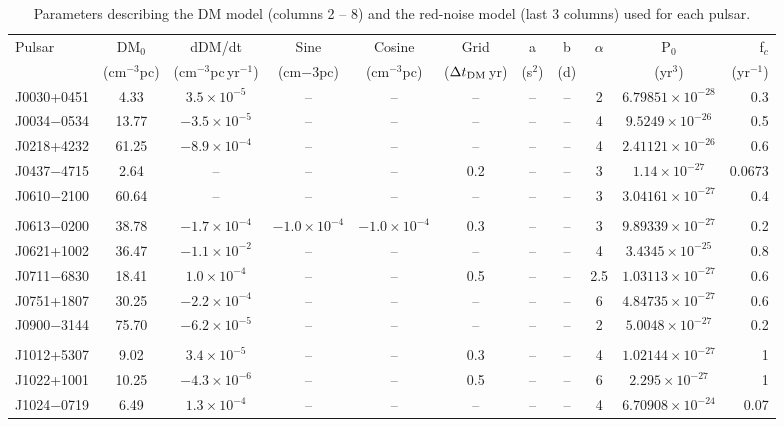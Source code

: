 \begin{table}
\caption{Parameters describing the DM model (columns 2 -- 8) and the red-noise model (last 3 columns) used for each pulsar.}\label{tb:dmModel}
\begin{tabular}{lcccccccccr}
\hline
Pulsar & DM$_0$ & dDM/dt & Sine  & Cosine & Grid & a & b & $\alpha$ & P$_0$ & f$_c$ \\
 & (cm$^{-3}$pc) & (cm$^{-3}$pc\,yr$^{-1}$) & (cm${-3}$pc) & (cm$^{-3}$pc) & ($\Delta t_{\rm DM}$\,yr) & (s$^2$) & (d) & & (yr$^3$) & (yr$^{-1}$) \\
\hline
J0030+0451 & 4.33  & $3.5\times 10^{-5}$ &  -- &  -- &  -- &  -- & -- & 2  & $6.79851\times 10^{-28}$ &  0.3\\
J0034$-$0534 & 13.77  & $-3.5\times 10^{-5}$ &  -- &  -- &  -- &  -- & -- & 4  & $9.5249\times 10^{-26}$ &  0.5\\
J0218+4232 & 61.25  & $-8.9\times 10^{-4}$ &  -- &  -- &  -- &  -- & -- & 4  & $2.41121\times 10^{-26}$ &  0.6\\
J0437$-$4715 & 2.64  &  -- &  -- &  -- & 0.2  &  -- & -- & 3  & $1.14\times 10^{-27}$ &  0.0673\\
J0610$-$2100 & 60.64  &  -- &  -- &  -- &  -- &  -- & -- & 3  & $3.04161\times 10^{-27}$ &  0.4\\
\\
J0613$-$0200 & 38.78  & $-1.7\times 10^{-4}$ & $-1.0\times 10^{-4}$ & $-1.0\times 10^{-4}$ & 0.3  &  -- & -- & 3  & $9.89339\times 10^{-27}$ &  0.2\\
J0621+1002 & 36.47  & $-1.1\times 10^{-2}$ &  -- &  -- &  -- &  -- & -- & 4  & $3.4345\times 10^{-25}$ &  0.8\\
J0711$-$6830 & 18.41  & $1.0\times 10^{-4}$ &  -- &  -- & 0.5  &  -- & -- & 2.5  & $1.03113\times 10^{-27}$ &  0.6\\
J0751+1807 & 30.25  & $-2.2\times 10^{-4}$ &  -- &  -- &  -- &  -- & -- & 6  & $4.84735\times 10^{-27}$ &  0.6\\
J0900$-$3144 & 75.70  & $-6.2\times 10^{-5}$ &  -- &  -- &  -- &  -- & -- & 2  & $5.0048\times 10^{-27}$ &  0.2\\
\\
J1012+5307 & 9.02  & $3.4\times 10^{-5}$ &  -- &  -- & 0.3  &  -- & -- & 4  & $1.02144\times 10^{-27}$ &  1\\
J1022+1001 & 10.25  & $-4.3\times 10^{-6}$ &  -- &  -- & 0.5  &  -- & -- & 6  & $2.295\times 10^{-27}$ &  1\\
J1024$-$0719 & 6.49  & $1.3\times 10^{-4}$ &  -- &  -- &  -- &  -- & -- & 4  & $6.70908\times 10^{-24}$ &  0.07\\

\end{tabular}
\end{table}
